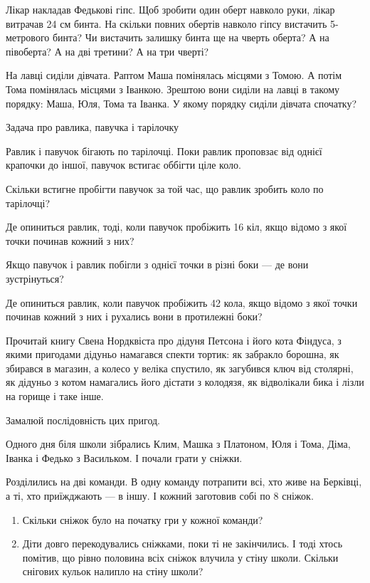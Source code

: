 \problem
Лікар накладав Федькові гіпс.
Щоб зробити один оберт навколо руки, лікар витрачав 24 см бинта.
На скільки повних обертів навколо гіпсу вистачить 5-метрового бинта?
Чи вистачить залишку бинта ще на чверть оберта?
А на півоберта?
А на дві третини?
А на три чверті?


\problem
На лавці сиділи дівчата. Раптом Маша помінялась місцями з Томою.
А потім Тома помінялась місцями з Іванкою.
Зрештою вони сиділи на лавці в такому порядку: Маша, Юля, Тома та Іванка.
У якому порядку сиділи дівчата спочатку?


\problem
Задача про равлика, павучка і тарілочку

Равлик і павучок бігають по тарілочці.
Поки равлик проповзає від однієї крапочки до іншої,
павучок встигає оббігти ціле коло. 

Скільки встигне пробігти павучок за той час,
що равлик зробить коло по тарілочці? 

Де опиниться равлик, тоді, коли павучок пробіжить 16 кіл,
якщо відомо з якої точки починав кожний з них? 

Якщо павучок і равлик побігли з однієї точки в різні боки --- 
де вони зустрінуться? 

Де опиниться равлик, коли павучок пробіжить 42 кола, якщо відомо
з якої точки починав кожний з них і рухались вони в протилежні боки?


\problem
Прочитай книгу Свена Нордквіста про дідуня Петсона і його кота Фіндуса,
з якими пригодами дідуньо намагався спекти тортик: як забракло борошна,
як збирався в магазин, а колесо у веліка спустило, як загубився ключ
від столярні, як дідуньо з котом намагались його дістати з колодязя,
як відволікали бика і лізли на горище і таке інше.

Замалюй послідовність цих пригод.


\problem
Одного дня біля школи зібрались Клим, Машка з Платоном, Юля і Тома,
Діма, Іванка і Федько з Васильком. І почали грати у сніжки.

Розділились на дві команди. В одну команду потрапити всі,
хто живе на Берківці, а ті, хто приїжджають --- в іншу.
І кожний заготовив собі по 8 сніжок.

\begin{enumerate}
    \item Скільки сніжок було на початку гри у кожної команди?
    \item Діти довго перекодувались сніжками, поки ті не закінчились.
    І тоді хтось помітив, що рівно половина всіх сніжок влучила у стіну школи.
    Скільки снігових кульок налипло на стіну школи?
\end{enumerate}


